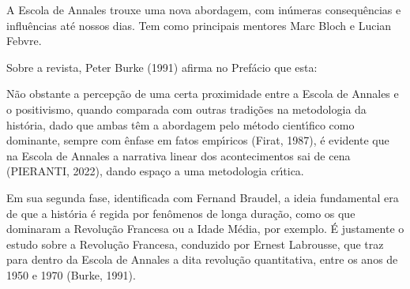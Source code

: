 \documentclass[
12pt,		%
openright,	%
twoside,  %
a4paper,			%
chapter=TITLE,		%
english,			%
french,				%
spanish,			%
brazil				%
]{USPSC-classe/USPSC}
\begin{document}
A Escola de Annales trouxe uma nova abordagem, com in\'umeras consequ\^encias e influ\^encias at\'e nossos dias. Tem como principais mentores  Marc Bloch e Lucian Febvre.










Sobre a revista, Peter Burke (1991) afirma no Pref\'acio que esta:











\noindent\begin{center}\mbox{\centering{}}\end{center}


N\~ao obstante a percep\c{c}\~ao de uma certa proximidade entre a Escola de Annales e o positivismo, quando comparada com outras tradi\c{c}\~oes na metodologia da hist\'oria, dado que ambas t\^em a abordagem pelo m\'etodo cient\'{\i}fico como dominante, sempre com \^enfase em fatos emp\'{\i}ricos (Firat, 1987), \'e evidente que na Escola de Annales a narrativa linear dos acontecimentos sai de cena (PIERANTI, 2022), dando espa\c{c}o a uma metodologia cr\'{\i}tica.










Em sua segunda fase, identificada com Fernand Braudel, a ideia fundamental era de que a hist\'oria \'e regida por fen\^omenos de longa dura\c{c}\~ao, como os que dominaram a Revolu\c{c}\~ao Francesa ou a Idade M\'edia, por exemplo. \'E justamente o estudo sobre a Revolu\c{c}\~ao Francesa, conduzido por Ernest Labrousse, que traz para dentro da Escola de Annales a dita \textquotedbl revolu\c{c}\~ao quantitativa\textquotedbl , entre os anos de 1950 e 1970  (Burke, 1991).
\end{document}
